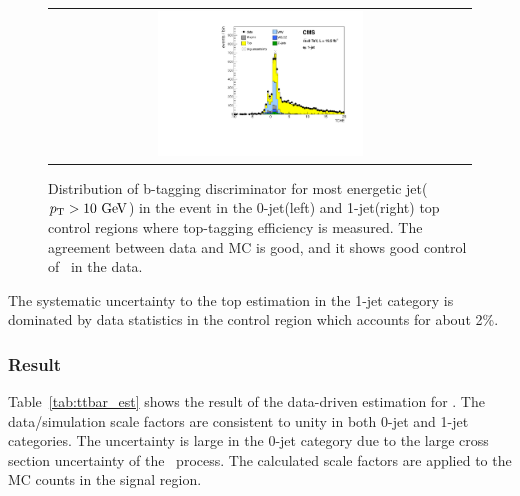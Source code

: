 \begin{figure}[htp]
\begin{tabular}{c}
\includegraphics[width=0.5\textwidth]{figures/topcontrol_tche_of_1j.pdf} 
\end{tabular} 
\caption{Distribution of b-tagging discriminator for most energetic jet($p_\mathrm{T}>10~\mathrm{Ge\kern -0.1em V}$) 
in the event in the 0-jet(left) and 1-jet(right) top control regions
where top-tagging efficiency is measured. The agreement between data and MC is good, 
and it shows good control of \topbkg\ in the data.} 
\label{fig:TCHE_topCR} 
\end{figure} 

The systematic uncertainty to the top estimation in the 1-jet category 
is dominated by data statistics in the control region which accounts for 
about 2\%.     

\subsubsection{Result}

Table~\ref{tab:ttbar_est} shows the result of the data-driven estimation for \topbkg. 
The data/simulation scale factors are consistent to unity in both 0-jet and 1-jet categories. 
The uncertainty is large in the 0-jet category due to the large cross section uncertainty 
of the \tw\ process. The calculated scale factors are applied to the MC counts 
in the signal region.


